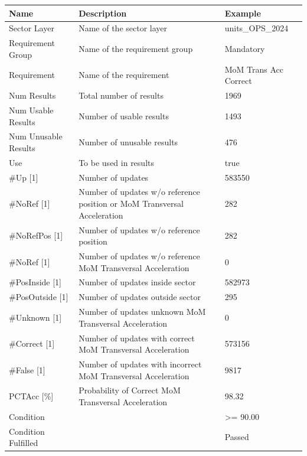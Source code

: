 \begin{center}
 \begin{table}[H]
  \begin{tabularx}{\textwidth}{ | l | X |  l | }
    \hline
    \textbf{Name} & \textbf{Description} & \textbf{Example} \\ \hline
    Sector Layer & Name of the sector layer & units\_OPS\_2024 \\ \hline
    Requirement Group & Name of the requirement group & Mandatory \\ \hline
    Requirement & Name of the requirement & MoM Trans Acc Correct \\ \hline
    Num Results & Total number of results & 1969 \\ \hline
    Num Usable Results & Number of usable results & 1493 \\ \hline
    Num Unusable Results & Number of unusable results & 476 \\ \hline
    Use & To be used in results & true \\ \hline
    \#Up [1] & Number of updates & 583550 \\ \hline
    \#NoRef [1] & Number of updates w/o reference position or MoM Transversal Acceleration & 282 \\ \hline
    \#NoRefPos [1] & Number of updates w/o reference position & 282 \\ \hline
    \#NoRef [1] & Number of updates w/o reference MoM Transversal Acceleration & 0 \\ \hline
    \#PosInside [1] & Number of updates inside sector & 582973 \\ \hline
    \#PosOutside [1] & Number of updates outside sector & 295 \\ \hline
    \#Unknown [1] & Number of updates unknown MoM Transversal Acceleration & 0 \\ \hline
    \#Correct [1] & Number of updates with correct MoM Transversal Acceleration & 573156 \\ \hline
    \#False [1] & Number of updates with incorrect MoM Transversal Acceleration & 9817 \\ \hline
    PCTAcc [\%] & Probability of Correct MoM Transversal Acceleration & 98.32 \\ \hline
    Condition &  & >= 90.00 \\ \hline
    Condition Fulfilled &  & Passed \\ \hline
    \end{tabularx}
\end{table}
\end{center}

